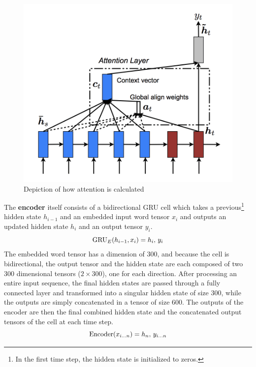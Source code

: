 \documentclass{article}
\begin{document}
\begin{figure}[H]
    \centering
    \includegraphics[scale=0.5]{images/attn_calc.png}
    \caption{Depiction of how attention is calculated \citep{luong}}
\end{figure}

The \textbf{encoder} itself consists of a bidirectional GRU cell \citep{gru} which takes a previous\footnote{In the first time step, the hidden state is initialized to zeros.} hidden state $h_{i-1}$ and an embedded input word tensor $x_i$ and outputs an updated hidden state $h_i$ and an output tensor $y_i$.
\begin{equation}
    \textnormal{GRU}_E(h_{i - 1}, x_i) = h_i\textnormal{, }y_i
\end{equation}
The embedded word tensor has a dimension of $300$, and because the cell is bidirectional, the output tensor and the hidden state are each composed of two $300$ dimensional tensors ($2 \times 300$), one for each direction. After processing an entire input sequence, the final hidden states are passed through a fully connected layer and transformed into a singular hidden state of size $300$, while the outputs are simply concatenated in a tensor of size $600$. The outputs of the encoder are then the final combined hidden state and the concatenated output tensors of the cell at each time step.
\begin{equation}
    \textnormal{Encoder}(x_{i...n}) = h_n\textnormal{, }y_{i...n}
\end{equation}
\end{document}
